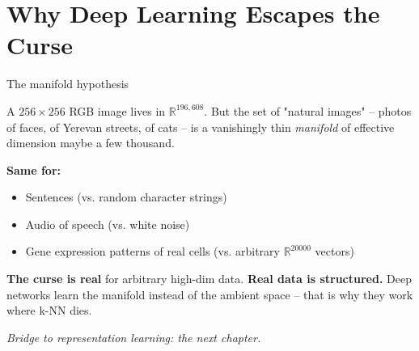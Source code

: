 \documentclass{beamer}
\begin{document}
\section{Why Deep Learning Escapes the Curse}

\begin{frame}{The manifold hypothesis}

A $256 \times 256$ RGB image lives in $\mathbb{R}^{196{,}608}$. But the set of "natural images" -- photos of faces, of Yerevan streets, of cats -- is a vanishingly thin \emph{manifold} of effective dimension maybe a few thousand.

\vspace{0.5em}
\textbf{Same for:}
\begin{itemize}
    \item Sentences (vs. random character strings)
    \item Audio of speech (vs. white noise)
    \item Gene expression patterns of real cells (vs. arbitrary $\mathbb{R}^{20000}$ vectors)
\end{itemize}

\vspace{0.5em}
\textbf{The curse is real} for arbitrary high-dim data. \textbf{Real data is structured.} Deep networks learn the manifold instead of the ambient space -- that is why they work where k-NN dies.

\vspace{0.5em}
\emph{Bridge to representation learning: the next chapter.}

\end{frame}
\end{document}
